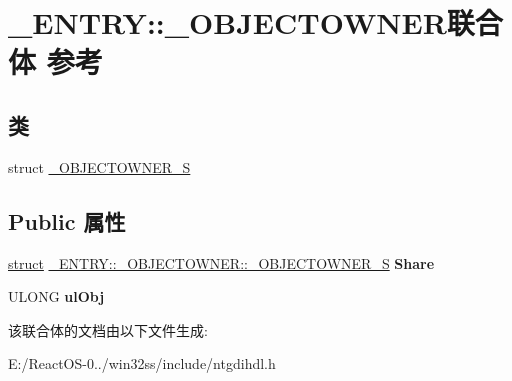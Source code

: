 \hypertarget{union___e_n_t_r_y_1_1___o_b_j_e_c_t_o_w_n_e_r}{}\section{\+\_\+\+E\+N\+T\+RY\+:\+:\+\_\+\+O\+B\+J\+E\+C\+T\+O\+W\+N\+E\+R联合体 参考}
\label{union___e_n_t_r_y_1_1___o_b_j_e_c_t_o_w_n_e_r}
\subsection*{类}
\begin{DoxyCompactItemize}
\item 
struct \hyperlink{struct___e_n_t_r_y_1_1___o_b_j_e_c_t_o_w_n_e_r_1_1___o_b_j_e_c_t_o_w_n_e_r___s}{\+\_\+\+O\+B\+J\+E\+C\+T\+O\+W\+N\+E\+R\+\_\+S}
\end{DoxyCompactItemize}
\subsection*{Public 属性}
\begin{DoxyCompactItemize}
\item 
\mbox{\label{union___e_n_t_r_y_1_1___o_b_j_e_c_t_o_w_n_e_r_aaa93e9188bb1115217e72c8cdbdcbc30}} 
\hyperlink{interfacestruct}{struct} \hyperlink{struct___e_n_t_r_y_1_1___o_b_j_e_c_t_o_w_n_e_r_1_1___o_b_j_e_c_t_o_w_n_e_r___s}{\+\_\+\+E\+N\+T\+R\+Y\+::\+\_\+\+O\+B\+J\+E\+C\+T\+O\+W\+N\+E\+R\+::\+\_\+\+O\+B\+J\+E\+C\+T\+O\+W\+N\+E\+R\+\_\+S} {\bfseries Share}
\item 
\mbox{\label{union___e_n_t_r_y_1_1___o_b_j_e_c_t_o_w_n_e_r_ae2da31642927fa28466c066b56f4324b}} 
U\+L\+O\+NG {\bfseries ul\+Obj}
\end{DoxyCompactItemize}


该联合体的文档由以下文件生成\+:\begin{DoxyCompactItemize}
\item 
E\+:/\+React\+O\+S-\/0../win32ss/include/ntgdihdl.\+h\end{DoxyCompactItemize}
